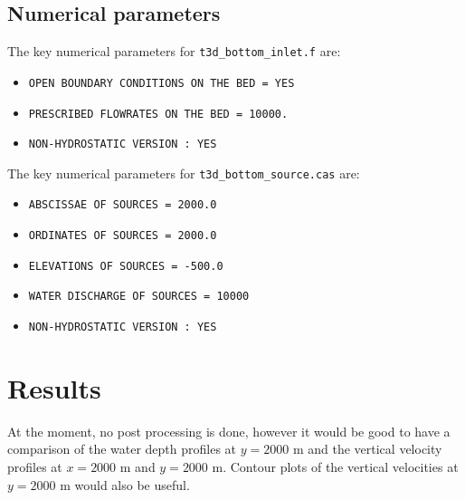 %
%
\subsection{Numerical parameters}
%
The key numerical parameters for \texttt{t3d\_bottom\_inlet.f} are:

\begin{itemize}
\item \texttt{OPEN BOUNDARY CONDITIONS ON THE BED = YES}
\item \texttt{PRESCRIBED FLOWRATES ON THE BED = 10000.}
\item \texttt{NON-HYDROSTATIC VERSION : YES}
\end{itemize}

The key numerical parameters for \texttt{t3d\_bottom\_source.cas} are:

\begin{itemize}
\item \texttt{ABSCISSAE OF SOURCES = 2000.0}
\item \texttt{ORDINATES OF SOURCES = 2000.0}
\item \texttt{ELEVATIONS OF SOURCES = -500.0}
\item \texttt{WATER DISCHARGE OF SOURCES = 10000}
\item \texttt{NON-HYDROSTATIC VERSION : YES}
\end{itemize}

%
%
\section{Results}
%
At the moment, no post processing is done, however it would be good to have a
comparison of the water depth profiles at $y=2000$ m and the vertical velocity
profiles at $x=2000$ m and $y=2000$ m. Contour plots of the vertical velocities
at $y=2000$ m would also be useful.



